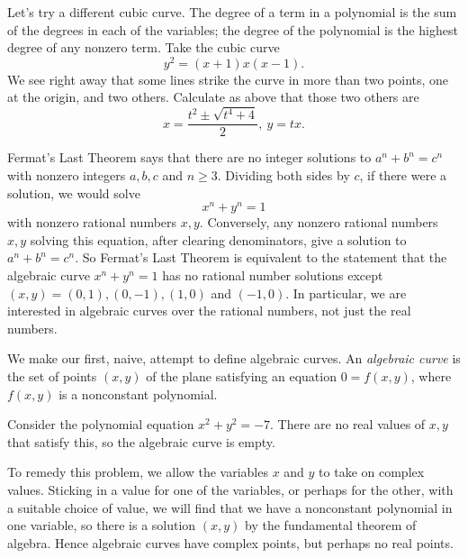 \begin{example}
Let's try a different cubic curve.
The degree of a term in a polynomial is the sum of the degrees in each of the variables; the degree of the polynomial is the highest degree of any nonzero term.
Take the cubic curve
\[
y^2=(x+1)x(x-1).
\]
{%
\pgfplotsset{compat=1.12,width=7cm}%
}%
We see right away that some lines strike the curve in more than two points, one at the origin, and two others.
Calculate as above that those two others are
\[
x=\frac{t^2\pm \sqrt{t^4+4}}{2}, \ y=tx.
\]
\end{example}

\begin{example}
Fermat's Last Theorem says that there are no integer solutions to \(a^n+b^n=c^n\) with nonzero integers \(a,b,c\) and \(n\ge 3\).
Dividing both sides by \(c\), if there were a solution, we would solve 
\[
x^n+y^n=1
\]
with nonzero rational numbers \(x,y\).
Conversely, any nonzero rational numbers \(x,y\) solving this equation, after clearing denominators, give a solution to \(a^n+b^n=c^n\).
So Fermat's Last Theorem is equivalent to the statement that the algebraic curve \(x^n+y^n=1\) has no rational number solutions except \((x,y)=(0,1), (0,-1), (1,0)\) and \((-1,0)\).
In particular, we are interested in algebraic curves over the rational numbers, not just the real numbers.
\end{example}

We make our first, naive, attempt to define algebraic curves.
An \emph{algebraic curve} is the set of points \((x,y)\) of the plane satisfying an equation \(0=f(x,y)\), where \(f(x,y)\) is a nonconstant polynomial.

\begin{example}
Consider the polynomial equation \(x^2+y^2=-7\).
There are no real values of \(x,y\) that satisfy this, so the algebraic curve is empty.
\end{example}

To remedy this problem, we allow the variables \(x\) and \(y\) to take on complex values.
Sticking in a value for one of the variables, or perhaps for the other, with a suitable choice of value, we will find that we have a nonconstant polynomial in one variable, so there is a solution \((x,y)\) by the fundamental theorem of algebra.
Hence algebraic curves have complex points, but perhaps no real points.

